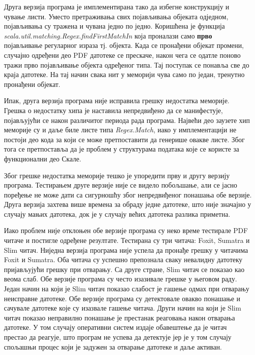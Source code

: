 \documentclass[12pt,oneside]{memoir}
\begin{document}
Друга верзија програма је имплементирана тако да избегне конструкцију и чување листи. Уместо претраживања свих појављивања објеката одједном, појављивања су тражена и чувана једно по једно. Коришћена је функција \textit{scala.util.matching.Regex.findFirstMatchIn} која проналази само \textbf{прво} појављивање регуларног израза тј. објекта. Када се пронађени објекат промени, случајно одређени део PDF датотеке се прескаче, након чега се одатле поново тражи прво појављивање објекта одређеног типа. Тај поступак се понавља све до краја датотеке. На тај начин свака нит у меморији чува само по један, тренутно пронађени објекат.

Ипак, друга верзија програма није исправила грешку недостатка меморије. Грешка о недостатку хипа је наставила непредвиђено да се манифестује, појављујући се након различитог периода рада програма. Највећи део заузете хип меморије су и даље биле листе типа \textit{Regex.Match}, иако у имплементацији не постоји део кода за који се може претпоставити да генерише овакве листе. Због тога се претпоставља да је проблем у структурама података које се користе за функционални део Скале.

Због грешке недостатка меморије тешко је упоредити прву и другу верзију програма. Тестирањем друге верзије није се видело побољшање, али се јасно поређење не може дати са сигурношћу због непредвиђеног понашања обе верзије. Друга верзија захтева више времена за обраду једне датотеке, што није значајно у случају мањих датотека, док је у случају већих датотека разлика приметна.

Иако проблем није отклоњен обе верзије програма су неко време тестирале PDF читаче и постигле одређене резултате. Тестирана су три читача: Foxit, Sumatra и Slim читач. Ниједна верзија програма није успела да пронађе грешку у читачима Foxit и Sumatra. Оба читача су успешно препознала сваку невалидну датотеку пријављујући грешку при отварању. Са друге стране, Slim читач се показао као веома слаб. Обе верзије програма су често изазивале грешке у његовом раду. Један начин на који је Slim читач показао слабост је гашење одмах при отварању неисправне датотеке. Обе верзије програма су детектовале овакво понашање и сачувале датотеке које су изазвале гашење читача. Други начин на који је Slim читач показао неправилно понашање је престанак реаговања након отварања датотеке. У том случају оперативни систем издаје обавештење да је читач престао да реагује, што програм не успева да детектује јер је у том случају спољашњи процес који је задужен за отварање датотеке и даље активан.
\end{document}
